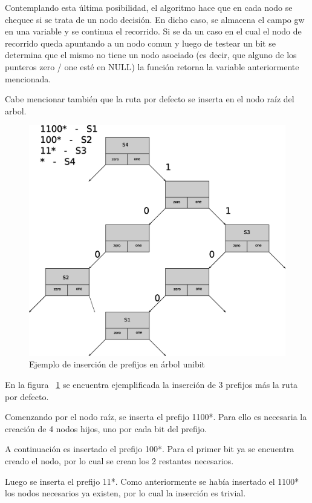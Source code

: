 Contemplando esta última posibilidad, el algoritmo hace que en cada nodo se chequee si se trata de un nodo decisión. En dicho caso, se almacena el campo gw en una variable y se continua el recorrido. Si se da un caso en el cual el nodo de recorrido queda apuntando a un nodo comun y luego de testear un bit se determina que el mismo no tiene un nodo asociado (es decir, que alguno de los punteros zero / one esté en NULL) la función retorna la variable anteriormente mencionada. 

Cabe mencionar también que la ruta por defecto se inserta en el nodo raíz del arbol.

\begin{figure}[H]
  \centering
	\includegraphics[scale=0.50]{4-implementacion/graf/lluinsert09.eps}
  \caption{Ejemplo de inserción de prefijos en árbol unibit}
  \label{fig:lluinsert}
\end{figure}

En la figura ~\ref{fig:lluinsert} se encuentra ejemplificada la inserción de 3 prefijos más la ruta por defecto. 

Comenzando por el nodo raíz, se inserta el prefijo 1100*. Para ello es necesaria la creación de 4 nodos hijos, uno por cada bit del prefijo. 

A continuación es insertado el prefijo 100*. Para el primer bit ya se encuentra creado el nodo, por lo cual se crean los 2 restantes necesarios.

Luego se inserta el prefijo 11*. Como anteriormente se había insertado el 1100* los nodos necesarios ya existen, por lo cual la inserción es trivial.

